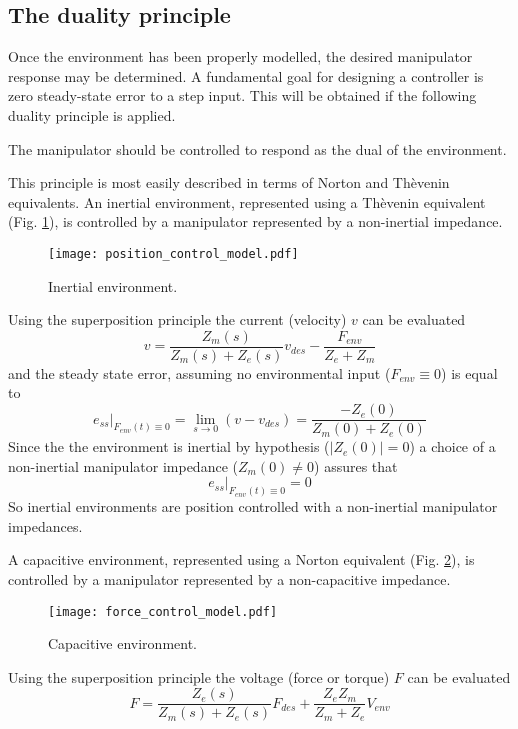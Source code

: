\subsection{The duality principle}
Once the environment has been properly modelled, the 
desired manipulator response may be determined. A fundamental goal for 
designing a controller is zero steady-state error to a step 
input. This will be obtained if the following duality principle is applied.
\begin{dualityprinciple}
  The manipulator should be controlled to respond as the dual of the environment.
\end{dualityprinciple}
This principle is most easily described in terms of Norton and Thèvenin equivalents.
An inertial environment, represented using a Thèvenin equivalent (Fig. \ref{fig:position_control_model}), is controlled by a manipulator represented by a non-inertial impedance.
\begin{figure}[h]
  \centering
  \texttt{[image: position\_control\_model.pdf]}
  \caption{Inertial environment. \label{fig:position_control_model}}
\end{figure}
Using the superposition principle the current (velocity) $v$ can be evaluated
\begin{equation}
  \label{eq:position_control_circuit}
  v = \frac{Z_m(s)}{Z_m(s) + Z_e(s)}v_{des} - 		\frac{F_{env}}{Z_e + Z_m}
\end{equation}
and the steady state error, assuming no environmental input ($F_{env} \equiv 0$) is equal to 
\[
e_{ss} \Big|_{F_{env}(t) \equiv 0} = \lim_{s \to 0}(v - v_{des}) = \frac{-Z_e(0)}{Z_m(0) + Z_e(0)}
\]
Since the the environment is inertial by hypothesis ($|Z_e(0)| = 0$) a choice of a non-inertial manipulator impedance ($Z_m(0) \neq 0$)
assures that
\[
e_{ss} \Big|_{F_{env}(t) \equiv 0} = 0
\]
So inertial environments are position controlled with a non-inertial manipulator impedances.
\par
A capacitive environment, represented using a Norton equivalent (Fig. \ref{fig:force_control_model}), 
is controlled by a manipulator represented by a 
non-capacitive impedance.
\begin{figure}[h]
  \centering
  \texttt{[image: force\_control\_model.pdf]}
  \caption{Capacitive environment. \label{fig:force_control_model}}
\end{figure}
Using the superposition principle the voltage (force or torque) $F$ can be evaluated
\begin{equation}
  \label{eq:force_control_circuit}
  F = \frac{Z_e(s)}{Z_m(s) + Z_e(s)}F_{des} + \frac{Z_e Z_m}{Z_m + Z_e} V_{env}
\end{equation}

